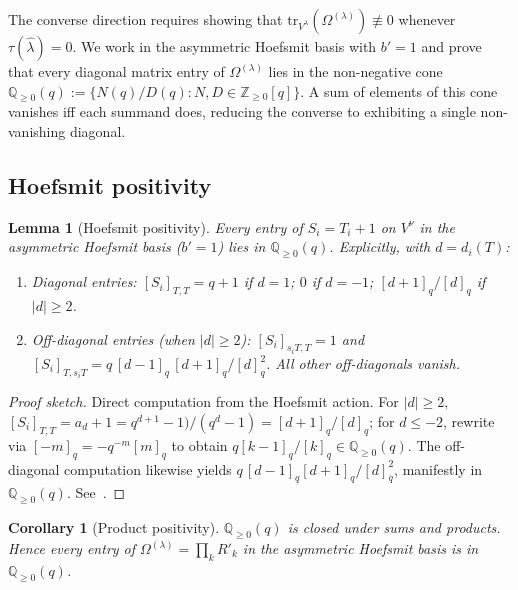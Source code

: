 \documentclass[11pt]{article}
\newtheorem{lemma}[theorem]{Lemma}
\newtheorem{corollary}[theorem]{Corollary}
\theoremstyle{definition}
\newcommand{\Vlam}{V^{\lambda}}
\newcommand{\Om}{\Omega}
\newcommand{\bla}{\widehat\lambda}
\newcommand{\Rp}{{R'}}
\newcommand{\tr}{\mathrm{tr}}
\newcommand{\qint}[1]{[#1]_q}
\begin{document}
The converse direction requires showing that $\tr_{\Vlam}(\Om^{(\lambda)}) \not\equiv 0$ whenever $\tau(\bla) = 0$.  We work in the asymmetric Hoefsmit basis with $b' = 1$ and prove that every diagonal matrix entry of $\Om^{(\lambda)}$ lies in the non-negative cone $\mathbb{Q}_{\ge 0}(q) := \{N(q)/D(q) : N, D \in \mathbb{Z}_{\ge 0}[q]\}$.  A sum of elements of this cone vanishes iff each summand does, reducing the converse to exhibiting a single non-vanishing diagonal.

\subsection{Hoefsmit positivity}

\begin{lemma}[Hoefsmit positivity]\label{lem:hoefsmit-positivity}
Every entry of $S_i = T_i + 1$ on $V^\nu$ in the asymmetric Hoefsmit basis ($b' = 1$) lies in $\mathbb{Q}_{\ge 0}(q)$.  Explicitly, with $d = d_i(T)$:
\begin{enumerate}[label=(\roman*),topsep=2pt,itemsep=2pt]
\item Diagonal entries: $[S_i]_{T,T} = q+1$ if $d = 1$; $0$ if $d = -1$; $\qint{d+1}/\qint{d}$ if $|d| \ge 2$.
\item Off-diagonal entries (when $|d| \ge 2$): $[S_i]_{s_iT, T} = 1$ and $[S_i]_{T, s_iT} = q\, \qint{d-1}\,\qint{d+1}/\qint{d}^{2}$.  All other off-diagonals vanish.
\end{enumerate}
\end{lemma}


\begin{proof}[Proof sketch]
Direct computation from the Hoefsmit action.  For $|d| \ge 2$, $[S_i]_{T,T} = a_d + 1 = q^{d+1} - 1)/(q^d - 1) = \qint{d+1}/\qint{d}$; for $d \le -2$, rewrite via $\qint{-m} = -q^{-m}\qint{m}$ to obtain $q \qint{k-1}/\qint{k} \in \mathbb{Q}_{\ge 0}(q)$.  The off-diagonal computation likewise yields $q\,\qint{d-1}\qint{d+1}/\qint{d}^2$, manifestly in $\mathbb{Q}_{\ge 0}(q)$.  See~\cite[Lemma~1]{conversePerSYT}.
\end{proof}

\begin{corollary}[Product positivity]\label{cor:product-positivity}
$\mathbb{Q}_{\ge 0}(q)$ is closed under sums and products.  Hence every entry of $\Om^{(\lambda)} = \prod_k \Rp_k$ in the asymmetric Hoefsmit basis is in $\mathbb{Q}_{\ge 0}(q)$.
\end{corollary}
\end{document}

